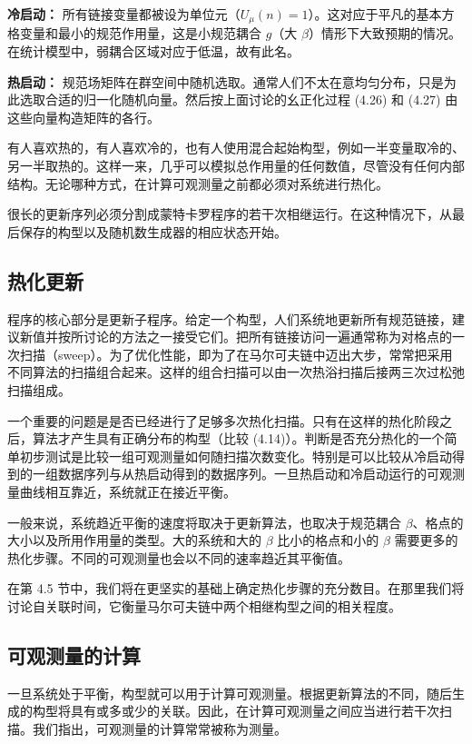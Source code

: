 \textbf{冷启动：} 所有链接变量都被设为单位元（$U_\mu(n) = 1$）。这对应于平凡的基本方格变量和最小的规范作用量，这是小规范耦合 $g$（大 $\beta$）情形下大致预期的情况。在统计模型中，弱耦合区域对应于低温，故有此名。

\textbf{热启动：} 规范场矩阵在群空间中随机选取。通常人们不太在意均匀分布，只是为此选取合适的归一化随机向量。然后按上面讨论的幺正化过程 (4.26) 和 (4.27) 由这些向量构造矩阵的各行。

有人喜欢热的，有人喜欢冷的，也有人使用混合起始构型，例如一半变量取冷的、另一半取热的。这样一来，几乎可以模拟总作用量的任何数值，尽管没有任何内部结构。无论哪种方式，在计算可观测量之前都必须对系统进行热化。

很长的更新序列必须分割成蒙特卡罗程序的若干次相继运行。在这种情况下，从最后保存的构型以及随机数生成器的相应状态开始。

\subsection{热化更新}

程序的核心部分是更新子程序。给定一个构型，人们系统地更新所有规范链接，建议新值并按所讨论的方法之一接受它们。把所有链接访问一遍通常称为对格点的一次扫描（sweep）。为了优化性能，即为了在马尔可夫链中迈出大步，常常把采用不同算法的扫描组合起来。这样的组合扫描可以由一次热浴扫描后接两三次过松弛扫描组成。

一个重要的问题是是否已经进行了足够多次热化扫描。只有在这样的热化阶段之后，算法才产生具有正确分布的构型（比较 (4.14)）。判断是否充分热化的一个简单初步测试是比较一组可观测量如何随扫描次数变化。特别是可以比较从冷启动得到的一组数据序列与从热启动得到的数据序列。一旦热启动和冷启动运行的可观测量曲线相互靠近，系统就正在接近平衡。

一般来说，系统趋近平衡的速度将取决于更新算法，也取决于规范耦合 $\beta$、格点的大小以及所用作用量的类型。大的系统和大的 $\beta$ 比小的格点和小的 $\beta$ 需要更多的热化步骤。不同的可观测量也会以不同的速率趋近其平衡值。

在第 4.5 节中，我们将在更坚实的基础上确定热化步骤的充分数目。在那里我们将讨论自关联时间，它衡量马尔可夫链中两个相继构型之间的相关程度。

\subsection{可观测量的计算}

一旦系统处于平衡，构型就可以用于计算可观测量。根据更新算法的不同，随后生成的构型将具有或多或少的关联。因此，在计算可观测量之间应当进行若干次扫描。我们指出，可观测量的计算常常被称为测量。

